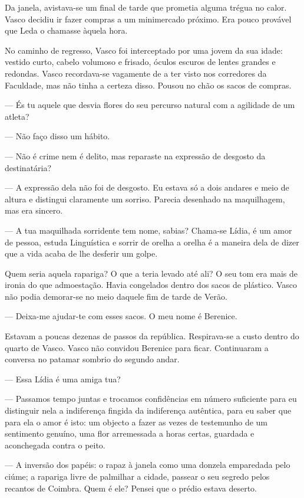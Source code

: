 Da janela, avistava-se um
final de tarde que prometia alguma trégua no calor. Vasco decidiu ir
fazer compras a um minimercado próximo. Era pouco provável que Leda o
chamasse àquela hora.

No caminho de regresso, Vasco foi interceptado por uma jovem da sua
idade: vestido curto, cabelo volumoso e frisado, óculos escuros de
lentes grandes e redondas. Vasco recordava-se vagamente de a ter visto nos corredores da Faculdade, mas não tinha
a certeza disso. Pousou no chão os sacos de compras.

--- És tu aquele que desvia flores do seu percurso natural com a agilidade
  de um atleta?

--- Não faço disso um hábito.

--- Não é crime nem é delito, mas reparaste na expressão de desgosto da
  destinatária?

--- A expressão dela não foi de desgosto. Eu estava só a dois andares e
  meio de altura e distingui claramente um sorriso. Parecia desenhado
  na maquilhagem, mas era sincero.

--- A tua maquilhada sorridente tem nome, sabias? Chama-se Lídia, é um
  amor de pessoa, estuda Linguística e sorrir de orelha a orelha é a
  maneira dela de dizer que a vida acaba de lhe desferir um golpe.

Quem seria aquela rapariga? O que a teria levado até ali? O seu tom era
mais de ironia do que admoestação. Havia congelados dentro dos sacos de
plástico. Vasco não podia demorar-se no meio daquele fim de tarde de
Verão.

--- Deixa-me ajudar-te com esses sacos. O meu nome é Berenice.

Estavam a poucas dezenas de passos da república. Respirava-se a custo
dentro do quarto de Vasco. Vasco não convidou Berenice para ficar.
Continuaram a conversa no patamar sombrio do segundo andar.

--- Essa Lídia é uma amiga tua?

--- Passamos tempo juntas e trocamos confidências em número suficiente
  para eu distinguir nela a indiferença fingida da indiferença
  autêntica, para eu saber que para ela o amor é isto: um objecto a
  fazer as vezes de testemunho de um sentimento genuíno, uma flor
  arremessada a horas certas, guardada e aconchegada contra o peito.

--- A inversão dos papéis: o rapaz à janela como uma donzela emparedada
  pelo ciúme; a rapariga livre de palmilhar a cidade, passear o seu
  segredo pelos recantos de Coimbra. Quem é ele? Pensei que o prédio
  estava deserto.

